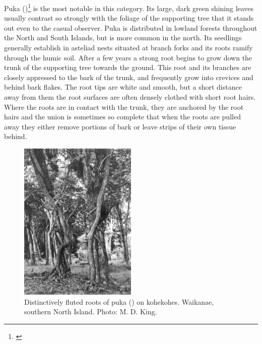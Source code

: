 Puka ()\footnote{\cite{dawson1966vegetative}} is the most notable in this category.
Its large, dark green shining leaves usually contrast so strongly with the foliage of the supporting tree that it stands out even to the casual observer.
Puka is distributed in lowland forests throughout the North and South Islands, but is more common in the north.
Its seedlings generally establish in asteliad nests situated at branch forks and its roots ramify through the humic soil.
After a few years a strong root begins to grow down the trunk of the supporting tree towards the ground.
This root and its branches are closely appressed to the bark of the trunk, and frequently grow into crevices and behind bark flakes.
The root tips are white and smooth, but a short distance away from them the root surfaces are often densely clothed with short root hairs.
Where the roots are in contact with the trunk, they are anchored by the root hairs and the union is sometimes so complete that when the roots are pulled away they either remove portions of bark or leave strips of their own tissue behind.

\begin{figure}
	\includegraphics[width=0.5\textwidth]{graphics/figure46puka-roots.jpg}
	\centering
	\caption[Distinctively fluted roots of puka on kohekohes]{Distinctively fluted roots of puka () on kohekohes.
    Waikanae, southern North Island.
	Photo: M. D. King.}
	\label{fig:46puka-roots}
\end{figure}

